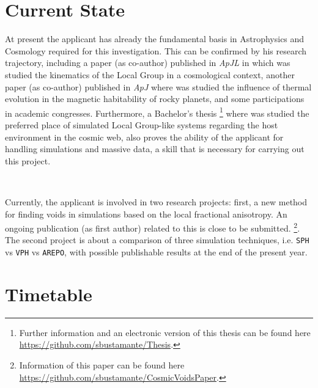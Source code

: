 \documentclass[a4,useAMS,usenatbib,usegraphicx,12pt]{article}
\begin{document}
\section{Current State}


At present the applicant has already the fundamental basis in Astrophysics and
Cosmology required for this investigation. This can be confirmed by his research 
trajectory, including a paper (as co-author) published in \textit{ApJL} in which 
was studied the kinematics of the Local Group in a cosmological context, another 
paper (as co-author) published in \textit{ApJ} where was studied the influence 
of thermal evolution in the magnetic habitability of rocky planets, and some 
participations in academic congresses. Furthermore, a Bachelor's thesis
\footnote{Further information and an electronic version of this thesis can be 
found here \url{https://github.com/sbustamante/Thesis}.} where was studied the 
preferred place of simulated Local Group-like systems regarding the host 
environment in the cosmic web, also proves the ability of the applicant for 
handling simulations and massive data, a skill that is necessary for carrying 
out this project.

\

Currently, the applicant is involved in two research projects: first, a new 
method for finding voids in simulations based on the local fractional 
anisotropy. An ongoing publication (as first author) related to this is close 
to be submitted. \footnote{Information of this paper can be found here 
\url{https://github.com/sbustamante/CosmicVoidsPaper}.}. The second project is
about a comparison of three simulation techniques, i.e. \texttt{SPH} vs 
\texttt{VPH} vs \texttt{AREPO}, with possible publishable results at the end of
the present year.

\section{Timetable}
\end{document}
